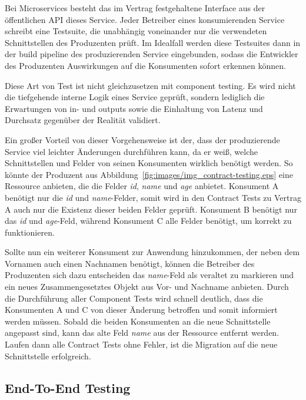 \documentclass[12pt,a4paper,bibliography=totocnumbered,listof=totocnumbered]{scrartcl}
\begin{document}
Bei Microservices besteht das im Vertrag festgehaltene Interface aus der öffentlichen \ac{API} dieses Service. Jeder Betreiber eines konsumierenden Service schreibt eine Testsuite, die unabhängig voneinander nur die verwendeten Schnittstellen des Produzenten prüft. Im Idealfall werden diese Testsuites dann in der build pipeline des produzierenden Service eingebunden, sodass die Entwickler des Produzenten Auswirkungen auf die Konsumenten sofort erkennen können.\cite{clemson}

Diese Art von Test ist nicht gleichzusetzen mit component testing. Es wird nicht die tiefgehende interne Logik eines Service geprüft, sondern lediglich die Erwartungen von in- und outputs sowie die Einhaltung von Latenz und Durchsatz gegenüber der Realität validiert.\cite{clemson}


Ein großer Vorteil von dieser Vorgehensweise ist der, dass der produzierende Service viel leichter Änderungen durchführen kann, da er weiß, welche Schnittstellen und Felder von seinen Konsumenten wirklich benötigt werden. So könnte der Produzent aus Abbildung~\ref{fig:images/img_contract-testing.eps} eine Ressource anbieten, die die Felder \textit{id}, \textit{name} und \textit{age} anbietet. Konsument A benötigt nur die \textit{id} und \textit{name}-Felder, somit wird in den Contract Tests zu Vertrag A auch nur die Existenz dieser beiden Felder geprüft. Konsument B benötigt nur das \textit{id} und \textit{age}-Feld, während Konsument C alle Felder benötigt, um korrekt zu funktionieren.\cite{clemson}

Sollte nun ein weiterer Konsument zur Anwendung hinzukommen, der neben dem Vornamen auch einen Nachnamen benötigt, können die Betreiber des Produzenten sich dazu entscheiden das \textit{name}-Feld als veraltet zu markieren und ein neues Zusammengesetztes Objekt aus Vor- und Nachname anbieten. Durch die Durchführung aller Component Tests wird schnell deutlich, dass die Konsumenten A und C von dieser Änderung betroffen und somit informiert werden müssen. Sobald die beiden Konsumenten an die neue Schnittstelle angepasst sind, kann das alte Feld \textit{name} aus der Ressource entfernt werden. Laufen dann alle Contract Tests ohne Fehler, ist die Migration auf die neue Schnittstelle erfolgreich.\cite{clemson}

\subsection{End-To-End Testing}
\end{document}
